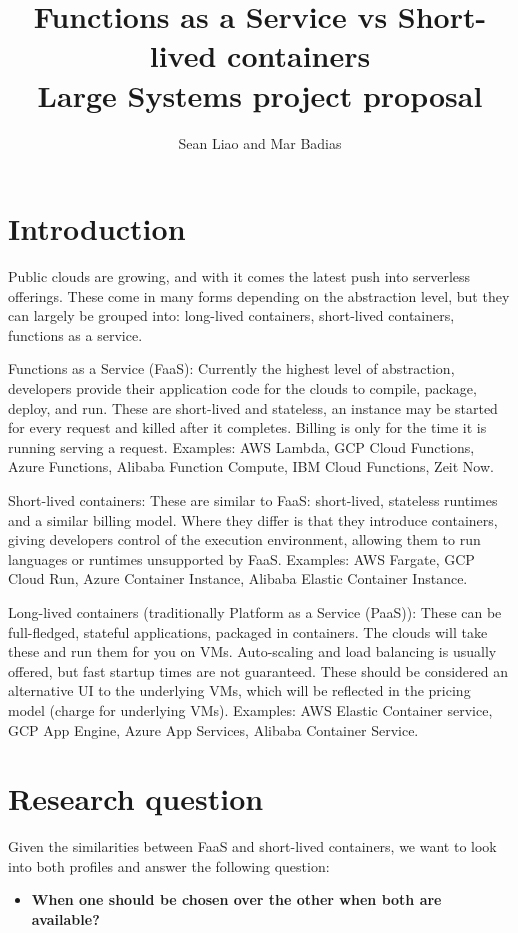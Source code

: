 \documentclass[11pt]{article}
\title{%
  Functions as a Service vs Short-lived containers \\
  \large Large Systems project proposal}
\author{Sean Liao and Mar Badias}
\begin{document}
\maketitle


\section{Introduction}
Public clouds are growing, and with it comes the latest push into serverless offerings. These come in many forms depending on the abstraction level, but they can largely be grouped into: long-lived containers, short-lived containers, functions as a service.

Functions as a Service (FaaS): Currently the highest level of abstraction, developers provide their application code for the clouds to compile, package, deploy, and run. These are short-lived and stateless, an instance may be started for every request and killed after it completes. Billing is only for the time it is running serving a request. Examples: AWS Lambda, GCP Cloud Functions, Azure Functions, Alibaba Function Compute, IBM Cloud Functions, Zeit Now.

Short-lived containers: These are similar to FaaS: short-lived, stateless runtimes and a similar billing model. Where they differ is that they introduce containers, giving developers control of the execution environment, allowing them to run languages or runtimes unsupported by FaaS. Examples: AWS Fargate, GCP Cloud Run, Azure Container Instance, Alibaba Elastic Container Instance.

Long-lived containers (traditionally Platform as a Service (PaaS)): These can be full-fledged, stateful applications, packaged in containers. The clouds will take these and run them for you on VMs. Auto-scaling and load balancing is usually offered, but fast startup times are not guaranteed. These should be considered an alternative UI to the underlying VMs, which will be reflected in the pricing model (charge for underlying VMs). Examples: AWS Elastic Container service, GCP App Engine, Azure App Services, Alibaba Container Service.


\section{Research question}
Given the similarities between FaaS and short-lived containers, we want to look into both profiles and answer the following question:

\begin{itemize}
\item \textbf{When one should be chosen over the other when both are available?}
\end{itemize}
\end{document}
